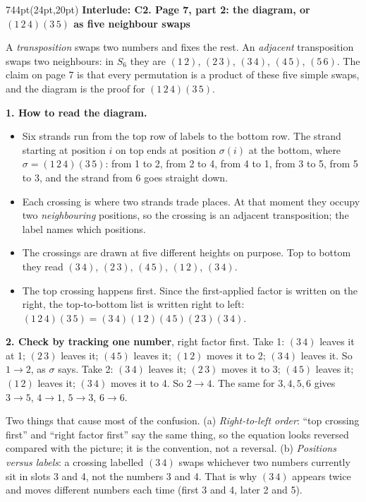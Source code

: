 \documentclass[10pt]{article}
\newcommand{\interlude}[2]{%
  \begin{textblock*}{744pt}(24pt,20pt)
    {\sffamily\bfseries\large\color{big} Interlude: #1}\par\vspace{4pt}
    \small #2\end{textblock*}\mbox{}\clearpage}
\begin{document}
\interlude{C2. Page 7, part 2: the diagram, or $(1\,2\,4)(3\,5)$ as five neighbour swaps}{
\begin{minipage}[t]{744pt}\vspace{0pt}
\small
A \emph{transposition} swaps two numbers and fixes the rest. An \emph{adjacent} transposition swaps two neighbours: in $S_6$ they are $(1\,2)$, $(2\,3)$, $(3\,4)$, $(4\,5)$, $(5\,6)$. The claim on page 7 is that every permutation is a product of these five simple swaps, and the diagram is the proof for $(1\,2\,4)(3\,5)$.\par\vspace{6pt}
\begin{minipage}[t]{340pt}\vspace{0pt}
{\sffamily\bfseries 1. How to read the diagram.}
\begin{itemize}[nosep,leftmargin=*]
\item Six strands run from the top row of labels to the bottom row. The strand starting at position $i$ on top ends at position $\sigma(i)$ at the bottom, where $\sigma=(1\,2\,4)(3\,5)$: from 1 to 2, from 2 to 4, from 4 to 1, from 3 to 5, from 5 to 3, and the strand from 6 goes straight down.
\item Each crossing is where two strands trade places. At that moment they occupy two \emph{neighbouring} positions, so the crossing is an adjacent transposition; the label names which positions.
\item The crossings are drawn at five different heights on purpose. Top to bottom they read $(3\,4)$, $(2\,3)$, $(4\,5)$, $(1\,2)$, $(3\,4)$.
\item The top crossing happens first. Since the first-applied factor is written on the right, the top-to-bottom list is written right to left: $(1\,2\,4)(3\,5)=(3\,4)(1\,2)(4\,5)(2\,3)(3\,4)$.
\end{itemize}
\vspace{4pt}
{\sffamily\bfseries 2. Check by tracking one number}, right factor first. Take 1: $(3\,4)$ leaves it at 1; $(2\,3)$ leaves it; $(4\,5)$ leaves it; $(1\,2)$ moves it to 2; $(3\,4)$ leaves it. So $1\to2$, as $\sigma$ says. Take 2: $(3\,4)$ leaves it; $(2\,3)$ moves it to 3; $(4\,5)$ leaves it; $(1\,2)$ leaves it; $(3\,4)$ moves it to 4. So $2\to4$. The same for $3,4,5,6$ gives $3\to5$, $4\to1$, $5\to3$, $6\to6$.
\begin{pitfall}
Two things that cause most of the confusion. (a) \emph{Right-to-left order}: ``top crossing first'' and ``right factor first'' say the same thing, so the equation looks reversed compared with the picture; it is the convention, not a reversal. (b) \emph{Positions versus labels}: a crossing labelled $(3\,4)$ swaps whichever two numbers currently sit in slots 3 and 4, not the numbers 3 and 4. That is why $(3\,4)$ appears twice and moves different numbers each time (first 3 and 4, later 2 and 5).

\end{pitfall}
\end{minipage}
\end{minipage}}
\end{document}
